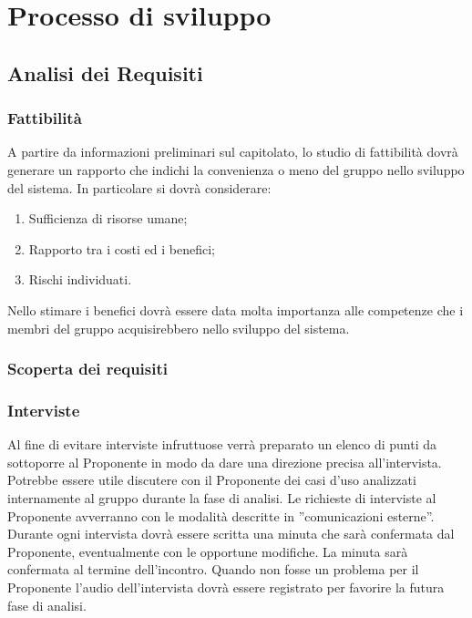 \section{Processo di sviluppo}
	\subsection{Analisi dei Requisiti}{ 
	   \subsubsection{Fattibilità}{
	    		A partire da informazioni preliminari sul capitolato, lo studio di fattibilità dovrà generare un rapporto che indichi la convenienza o meno del gruppo nello sviluppo del sistema. In particolare si dovrà considerare:
	    		\begin{enumerate}
	    			\item Sufficienza di risorse umane;
	    			\item Rapporto tra i costi ed i benefici;
	    			\item Rischi individuati.
	    		\end{enumerate}
	    		Nello stimare i benefici dovrà essere data molta importanza alle competenze che i membri del gruppo acquisirebbero nello sviluppo del sistema.
	    	 }
		\subsubsection{Scoperta dei requisiti}{
			\subsubsection{Interviste}
			Al fine di evitare interviste infruttuose verrà preparato un elenco di punti da sottoporre al Proponente in modo da dare una direzione precisa all’intervista. Potrebbe essere utile discutere con il Proponente dei casi d'uso analizzati internamente al gruppo durante la fase di analisi.
			Le richieste di interviste al Proponente avverranno con le modalità descritte in ”comunicazioni esterne”. Durante ogni intervista dovrà essere scritta una minuta che sarà confermata dal Proponente, eventualmente con le opportune modifiche. La minuta sarà confermata al termine dell’incontro. Quando non fosse un problema per il Proponente l’audio dell’intervista dovrà essere registrato per favorire la futura fase di analisi.
}}
